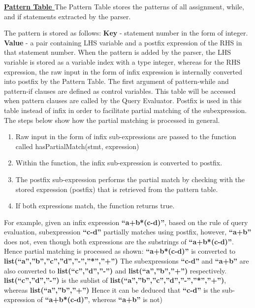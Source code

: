 \documentclass[12pt]{article}
\begin{document}
\textbf{\underline{Pattern Table
}}
\newline The Pattern Table stores the patterns of all assignment, while, and if statements extracted by the parser. 

The pattern is stored as follows:\newline
\textbf{Key }- statement number in the form of integer.\newline
\textbf{Value} - a pair containing LHS variable and a postfix expression of the RHS in that statement number. \newline
When the pattern is added by the parser, the LHS variable is stored as a variable index with a type integer, whereas for the RHS expression, the raw input in the form of infix expression is internally converted into postfix by the Pattern Table. The first argument of pattern-while and pattern-if clauses are defined as control variables. This table will be accessed when pattern clauses are called by the Query Evaluator. Postfix is used in this table instead of infix in order to facilitate partial matching of the subexpression. 
\newline The steps below show how the partial matching is processed in general.
\begin{enumerate}
\item Raw input in the form of infix sub-expressions are passed to the function called hasPartialMatch(stmt, expression)
\item Within the function, the infix sub-expression is converted to postfix.
\item The postfix sub-expression performs the partial match by checking with the stored expression (postfix) that is retrieved from the pattern table.
\item If both expressions match, the function returns true.
\end{enumerate}
For example, given an infix expression \textbf{“a+b*(c-d)”}, based on the rule of query evaluation, subexpression \textbf{“c-d”} partially matches using postfix, however, \textbf{“a+b”} does not, even though both expressions are the substrings of \textbf{“a+b*(c-d)”}. Hence partial matching is processed as shown:
\textbf{“a+b*(c-d)”} is converted to \textbf{list(“a”,”b”,”c”,”d”,”-”,”*”,”+”)}
The subexpressions \textbf{“c-d”} and \textbf{“a+b”} are also converted to \textbf{list(“c”,”d”,”-”)} and \textbf{list(“a”,”b”,”+”)} respectively.
\textbf{list(“c”,”d”,”-”)} is the sublist of \textbf{list(“a”,”b”,”c”,”d”,”-”,”*”,”+”)}, whereas \textbf{list(“a”,”b”,”+”)}
Hence it can be deduced that \textbf{“c-d”} is the sub-expression of \textbf{“a+b*(c-d)”}, whereas \textbf{“a+b”} is not) 
\end{document}
